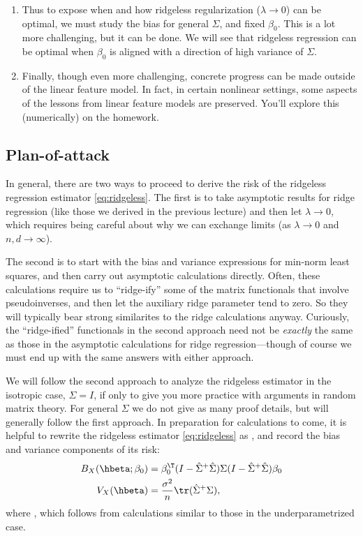 \documentclass{article}
\begin{document}
\begin{enumerate}
\item
Thus to expose when and how ridgeless regularization ($\lambda \to 0$) can be
optimal, we must study the bias for general $\Sigma$, and fixed $\beta_0$. This
is a lot more challenging, but it can be done. We will see that ridgeless
regression can be optimal when $\beta_0$ is aligned with a direction of high
variance of $\Sigma$.   

\item
Finally, though even more challenging, concrete progress can be made outside of
the linear feature model. In fact, in certain nonlinear settings, some aspects
of the lessons from linear feature models are preserved. You'll explore this
(numerically) on the homework.   
\end{enumerate}

\subsection{Plan-of-attack}

In general, there are two ways to proceed to derive the risk of the ridgeless
regression estimator \eqref{eq:ridgeless}. The first is to take asymptotic
results for ridge regression (like those we derived in the previous lecture) and 
then let $\lambda \to 0$, which requires being careful about why we can exchange
limits (as $\lambda \to 0$ and $n,d \to \infty$).  

The second is to start with the bias and variance expressions for min-norm 
least squares, and then carry out asymptotic calculations directly. Often, these
calculations require us to ``ridge-ify'' some of the matrix functionals
that involve pseudoinverses, and then let the auxiliary ridge parameter tend to
zero. So they will typically bear strong similarites to the ridge calculations 
anyway. Curiously, the ``ridge-ified'' functionals in the second approach need
not be \emph{exactly} the same as those in the asymptotic calculations for ridge
regression---though of course we must end up with the same answers with either 
approach.           

We will follow the second approach to analyze the ridgeless estimator in the
isotropic case, $\Sigma = I$, if only to give you more practice with arguments
in random matrix theory. For general $\Sigma$ we do not give as many proof
details, but will generally follow the first approach. In preparation for
calculations to come, it is helpful to rewrite the ridgeless estimator
\eqref{eq:ridgeless} as , and record the
bias and variance components of its risk:         
\begin{align}
\label{eq:ridgeless_bias}
B_X(\hbeta; \beta_0) &= \beta_0^\T (I - \hSigma^+ \hSigma) \Sigma 
  (I - \hSigma^+ \hSigma) \beta_0 \\  
\label{eq:ridgeless_var}
V_X(\hbeta) &= \frac{\sigma^2}{n} \tr (\hSigma^+ \Sigma),
\end{align}
where , which follows from calculations similar to
those in the underparametrized case.      
\end{document}
